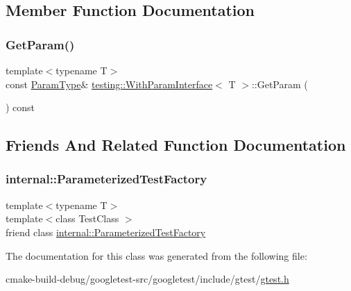 \subsection{Member Function Documentation}
\mbox{\label{classtesting_1_1WithParamInterface_aa7b9028f06ee7ec1174bb25317b07eb2}} 
\subsubsection{\texorpdfstring{GetParam()}{GetParam()}}
{\footnotesize\ttfamily template$<$typename T$>$ \\
const \mbox{\hyperlink{classtesting_1_1WithParamInterface_a343febaaebf1f025bda484f841d4fec1}{Param\+Type}}\& \mbox{\hyperlink{classtesting_1_1WithParamInterface}{testing\+::\+With\+Param\+Interface}}$<$ T $>$\+::Get\+Param (\begin{DoxyParamCaption}{ }\end{DoxyParamCaption}) const\hspace{0.3cm}{\ttfamily [inline]}}



\subsection{Friends And Related Function Documentation}
\mbox{\label{classtesting_1_1WithParamInterface_a7543eb7df89f00fff517dba24bc11dd5}} 
\subsubsection{\texorpdfstring{internal::ParameterizedTestFactory}{internal::ParameterizedTestFactory}}
{\footnotesize\ttfamily template$<$typename T$>$ \\
template$<$class Test\+Class $>$ \\
friend class \mbox{\hyperlink{classtesting_1_1internal_1_1ParameterizedTestFactory}{internal\+::\+Parameterized\+Test\+Factory}}\hspace{0.3cm}{\ttfamily [friend]}}



The documentation for this class was generated from the following file\+:\begin{DoxyCompactItemize}
\item 
cmake-\/build-\/debug/googletest-\/src/googletest/include/gtest/\mbox{\hyperlink{gtest_8h}{gtest.\+h}}\end{DoxyCompactItemize}
